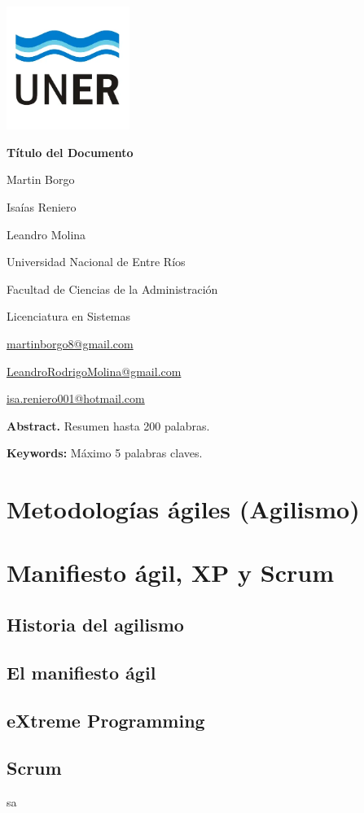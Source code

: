 \documentclass[a4paper,10pt]{article}
\begin{document}
	\pagestyle{empty}
	\begin{titlepage}
		\centering
		\vspace*{1.5cm}
		\includegraphics[width=0.3\textwidth]{unerlogo.png}
		\linebreak
		{\fontsize{14}{17}\bfseries Título del Documento\par}
		{\small Martin Borgo\par}
		{\small Isaías Reniero\par}
		{\small Leandro Molina\par}
		{\normalsize Universidad Nacional de Entre Ríos\par}
		{\normalsize Facultad de Ciencias de la Administración\par}
		{\normalsize Licenciatura en Sistemas\par}
		{\small \href{mailto:martinborgo8@gmail.com}{martinborgo8@gmail.com}\par}
		{\small \href{mailto:LeandroRodrigoMolina@gmail.com}{LeandroRodrigoMolina@gmail.com}\par}
		{\small \href{mailto:isa.reniero001@hotmail.com}{isa.reniero001@hotmail.com}\par}
		
		{\small \textbf{Abstract.} Resumen hasta 200 palabras. \par}
		{\small \textbf{Keywords:} Máximo 5 palabras claves. \par}
	\end{titlepage}
	
	\tableofcontents
	\thispagestyle{empty}
	
	\section{Metodologías ágiles (Agilismo)}
	\section{Manifiesto ágil, XP y Scrum}
	\subsection{Historia del agilismo}
	\subsection{El manifiesto ágil}
	\subsection{eXtreme Programming}
	\subsection{Scrum}
	sa
	\nocite{*}
	\printbibliography[heading=bibintoc]
\end{document}
